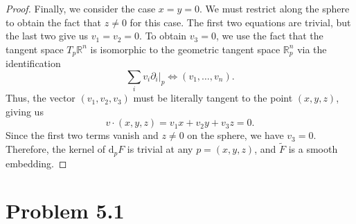 \documentclass[11pt, letterpaper]{article}
\theoremstyle{plain}
\begin{document}
\begin{proof}
	Finally, we consider the case $x=y=0$. We must restrict along the sphere to obtain the fact that $z\neq 0$ for this case. The first two equations are trivial, but the last two give us $v_1=v_2=0$. To obtain $v_3=0$, we use the fact that the tangent space $T_p\mathbb{R} ^n$ is isomorphic to the geometric tangent space $\mathbb{R} ^n_p$ via the identification
	\[
		\sum_{i} v_i \partial _i|_p \iff (v_1, \ldots ,v_n)
	.\]
	Thus, the vector $(v_1,v_2,v_3)$ must be literally tangent to the point $(x,y,z)$, giving us
	\[
		v\cdot (x,y,z)=v_1x+v_2y+v_3z=0
	.\]
	Since the first two terms vanish and $z\neq 0$ on the sphere, we have $v_3=0$. Therefore, the kernel of $\mathrm{d}_pF$ is trivial at any $p=(x,y,z)$, and $\widetilde{F} $ is a smooth embedding.
\end{proof}

\section{Problem 5.1}
\end{document}
